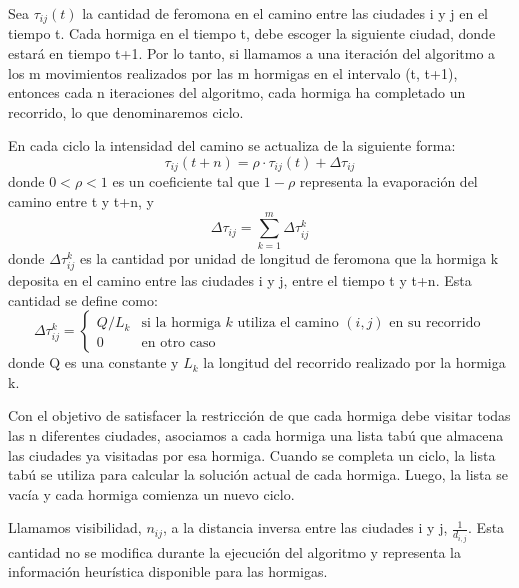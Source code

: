 Sea $\tau_{ij}(t)$ la cantidad de feromona en el camino entre las ciudades i y j en el tiempo t.
Cada hormiga en el tiempo t, debe escoger la siguiente ciudad, donde estará en tiempo t+1.
Por lo tanto, si llamamos a una iteración del algoritmo a los m movimientos realizados por las m hormigas en el intervalo (t, t+1), 
entonces cada n iteraciones del algoritmo, cada hormiga ha completado un recorrido, lo que denominaremos ciclo.

En cada ciclo la intensidad del camino se actualiza de la siguiente forma:
\begin{equation}
    \tau_{ij}(t+n) = \rho \cdot \tau_{ij}(t) + \Delta \tau_{ij}
\end{equation}
donde $0 < \rho < 1$ es un coeficiente tal que $1 - \rho$ representa la evaporación del camino entre t y t+n, y
\begin{equation}
   \Delta \tau_{ij} = \sum_{k=1}^{m} \Delta \tau_{ij}^k
\end{equation}
donde $\Delta \tau_{ij}^k$ es la cantidad por unidad de longitud de feromona que la hormiga k deposita en el camino entre las ciudades i y j, 
entre el tiempo t y t+n.
Esta cantidad se define como:
\begin{equation}
    \Delta \tau_{ij}^k = \begin{cases}
    Q / L_k & \text{si la hormiga } k \text{ utiliza el camino } (i, j) \text{ en su recorrido}\\
    0 & \text{en otro caso}
    \end{cases}
\end{equation}
donde Q es una constante y $L_k$ la longitud del recorrido realizado por la hormiga k.

Con el objetivo de satisfacer la restricción de que cada hormiga debe visitar todas las n diferentes ciudades, asociamos a cada hormiga
una lista tabú que almacena las ciudades ya visitadas por esa hormiga.
Cuando se completa un ciclo, la lista tabú se utiliza para calcular la solución actual de cada hormiga.
Luego, la lista se vacía y cada hormiga comienza un nuevo ciclo.

Llamamos visibilidad, $n_{ij}$, a la distancia inversa entre las ciudades i y j, $\frac{1}{d_{i,j}}$. 
Esta cantidad no se modifica durante la ejecución del algoritmo y representa la información heurística disponible para las hormigas.

